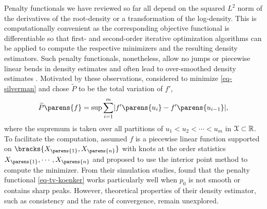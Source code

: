 Penalty functionals we have reviewed so far all depend on the squared $L^2$ norm of the derivatives of the root-density or a transformation of the log-density. This is computationally convenient as the corresponding objective functional is differentiable so that first- and second-order iterative optimization algorithms can be applied to compute the respective minimizers and the resulting density estimators. Such penalty functionals, nonetheless, allow no jumps or piecewise linear bends in density estimates and often lead to over-smoothed density estimates \parencites{Sardy2010-hp}. Motivated by these observations, \textcites{Koenker2007-zo} considered to minimize \eqref{eq-silverman} and chose $\widetilde{P}$ to be the total variation of $f'$, 
\begin{align}\label{eq-tv-koenker}
	\widetilde{P} \parens{f} = \sup \sum_{i=1}^m \abs{f' \parens{u_i} - f' \parens{u_{i-1}}}, 
\end{align}
where the supremum is taken over all partitions of $u_1 < u_2 < \cdots < u_m$ in $\mathcal{X} \subset \mathbb{R}$. 
To facilitate the computation, \textcite{Koenker2007-zo} assumed $f$ is a piecewise linear function supported on $\bracks{X_{\parens{1}}, X_{\parens{n}}}$ with knots at the order statistics $X_{\parens{1}}, \cdots, X_{\parens{n}}$ and proposed to use the interior point method to compute the minimizer. 
From their simulation studies, \textcite{Koenker2007-zo} found that the penalty functional \eqref{eq-tv-koenker} works particularly well when $p_0$ is not smooth or contains sharp peaks. However, theoretical properties of their density estimator, such as consistency and the rate of convergence, remain unexplored. 

